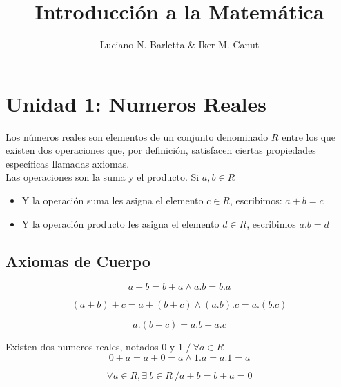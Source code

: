 \documentclass[10pt]{article}
\author{Luciano N. Barletta \& Iker M. Canut}
\begin{document}
\title{Introducción a la Matemática}
\maketitle
\date
\newpage

\tableofcontents
\newpage

\section{Unidad 1: Numeros Reales}
Los números reales son elementos de un conjunto denominado $R$ entre los que existen dos operaciones que, por definición, satisfacen ciertas propiedades específicas llamadas axiomas.\\ Las operaciones son la suma y el producto. Si $a,b \in R$
\begin{itemize}
\item Y la operación suma les asigna el elemento $c \in R$, escribimos: $a+b=c$
\item Y la operación producto les asigna el elemento $d \in R$, escribimos $a.b=d$
\end{itemize}


\subsection{Axiomas de Cuerpo}
\begin{axiom}{}
$$a+b=b+a \land a.b=b.a$$
\end{axiom}

\begin{axiom}{}
$$(a+b)+c=a+(b+c) \land (a.b).c=a.(b.c)$$
\end{axiom}

\begin{axiom}{}
$$a.(b+c)=a.b+a.c$$
\end{axiom}

\begin{axiom}{}
Existen dos numeros reales, notados 0 y 1 $/\ \forall a \in R$
$$0+a = a+0 = a \land 1.a = a.1 = a$$
\end{axiom}

\begin{axiom}{}
$$\forall a \in R, \exists\ b \in R\ / a+b = b+a = 0$$
\end{axiom}
\end{document}

